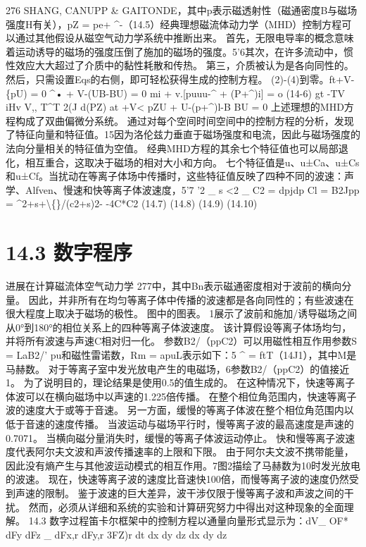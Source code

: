 \documentclass[UTF8,11pt,a4paper,openany,fontset=fandol]{ctexbook}
\begin{document}
276 SHANG, CANUPP \& GAITONDE，其中p表示磁透射性（磁通密度B与磁场强度H有关），pZ = pe+ \textasciicircum{}-（14.5）经典理想磁流体动力学（MHD）控制方程可以通过其他假设从磁空气动力学系统中推断出来。 首先，无限电导率的概念意味着运动诱导的磁场的强度压倒了施加的磁场的强度。5'6其次，在许多流动中，惯性效应大大超过了介质中的黏性耗散和传热。 第三，介质被认为是各向同性的。 然后，只需设置Eqs的右侧，即可轻松获得生成的控制方程。 (2)-(4)到零。ft+V-\{pU) = 0 \textasciicircum{}• + V-(UB-BU) = 0 mi + v.[puuu-\textasciicircum{} + (P+\textasciicircum{})i] = o (14-6) gt -TV iHv V,, T\textasciicircum{}T 2(J d(PZ) at +V< pZU + U-(p+\textasciicircum{})l-B BU = 0 上述理想的MHD方程构成了双曲偏微分系统。 通过对每个空间时间空间中的控制方程的分析，发现了特征向量和特征值。15因为洛伦兹力垂直于磁场强度和电流，因此与磁场强度的法向分量相关的特征值为空值。 经典MHD方程的其余七个特征值也可以局部退化，相互重合，这取决于磁场的相对大小和方向。 七个特征值是u、u±Ca、u±Cs和u±Cf。当扰动在等离子体场中传播时，这些特征值反映了四种不同的波速：声学、Alfven、慢速和快等离子体波速度，5'7 '2 \_ s <2 \_ C2 = dpjdp Cl = B2Jpp = \textasciicircum{}2+s+\textbackslash\{\}/(c2+s)2- -4C*C2 (14.7) (14.8) (14.9) (14.10)

\section{14.3 数字程序}
进展在计算磁流体空气动力学 277中，其中Bn表示磁通密度相对于波前的横向分量。 因此，并非所有在均匀等离子体中传播的波速都是各向同性的；有些波速在很大程度上取决于磁场的极性。 图中的图表。 1展示了波前和施加/诱导磁场之间从0°到180°的相位关系上的四种等离子体波速度。 该计算假设等离子体场均匀，并将所有波速与声速C相对归一化。 参数B2/（ppC2）可以用磁性相互作用参数S = LaB2/' pu和磁性雷诺数，Rm = apuL表示如下：5 \textasciicircum{} = ftT（14J1），其中M是马赫数。 对于等离子室中发光放电产生的电磁场，6参数B2/（ppC2）的值接近1。 为了说明目的，理论结果是使用0.5的值生成的。 在这种情况下，快速等离子体波可以在横向磁场中以声速的1.225倍传播。 在整个相位角范围内，快速等离子波的速度大于或等于音速。 另一方面，缓慢的等离子体波在整个相位角范围内以低于音速的速度传播。 当波运动与磁场平行时，慢等离子波的最高速度是声速的0.7071。 当横向磁分量消失时，缓慢的等离子体波运动停止。 快和慢等离子波速度代表阿尔夫文波和声波传播速率的上限和下限。 由于阿尔夫文波不携带能量，因此没有熵产生与其他波运动模式的相互作用。7图2描绘了马赫数为10时发光放电的波速。 现在，快速等离子波的速度比音速快100倍，而慢等离子波的速度仍然受到声速的限制。 鉴于波速的巨大差异，波干涉仅限于慢等离子波和声波之间的干扰。 然而，必须从详细和系统的实验和计算研究努力中得出对这种现象的全面理解。 14.3 数字过程笛卡尔框架中的控制方程以通量向量形式显示为：dV\_ OF* dFy dFz \_ dFx,r dFy,r 3FZ)r dt dx dy dz dx dy dz
\end{document}
